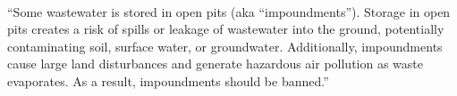 \documentclass{article}
\begin{document}
\paragraph{}
``Some wastewater is stored in open pits (aka “impoundments”). Storage in open pits creates a risk of spills or leakage of wastewater into the ground, potentially contaminating soil, surface water, or groundwater. Additionally, impoundments cause large land disturbances and generate hazardous air pollution as waste evaporates. As a result, impoundments should be banned.”
\end{document}
